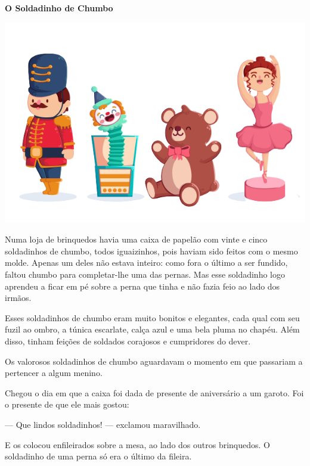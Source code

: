 \begin{myquote}
\textbf{O Soldadinho de Chumbo}


\begin{center}
\includegraphics[width=\textwidth]{media/image24a.png}
\end{center}


Numa loja de brinquedos havia uma caixa de papelão com vinte e cinco
soldadinhos de chumbo, todos iguaizinhos, pois haviam sido feitos com o
mesmo molde. Apenas um deles não estava inteiro: como fora o último a ser
fundido, faltou chumbo para completar-lhe uma das pernas. Mas esse soldadinho
logo aprendeu a ficar em pé sobre a perna que tinha e não fazia feio
ao lado dos irmãos.

Esses soldadinhos de chumbo eram muito bonitos e elegantes, cada qual
com seu fuzil ao ombro, a túnica escarlate, calça azul e uma bela pluma
no chapéu. Além disso, tinham feições de soldados corajosos e
cumpridores do dever.

Os valorosos soldadinhos de chumbo aguardavam o momento em que passariam
a pertencer a algum menino.

Chegou o dia em que a caixa foi dada de presente de aniversário a um
garoto. Foi o presente de que ele mais gostou:

--- Que lindos soldadinhos! --- exclamou maravilhado.

E os colocou enfileirados sobre a mesa, ao lado dos outros brinquedos. O
soldadinho de uma perna só era o último da fileira.


\end{myquote}
